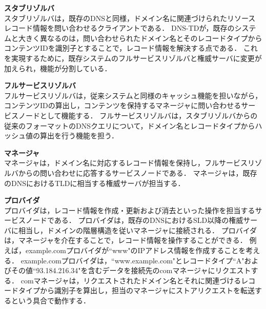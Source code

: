 \hspace{-12pt}\textbf{スタブリゾルバ}\\
\hspace{12pt}スタブリゾルバは，既存のDNSと同様，ドメイン名に関連づけられたリソースレコード情報を問い合わせるクライアントである．
DNS-TDが，既存のシステムと大きく異なるのは，問い合わせられたドメイン名とそのレコードタイプからコンテンツIDを識別子とすることで，レコード情報を解決する点である．
これを実現するために，既存システムのフルサービスリゾルバと権威サーバに変更が加えられ，機能が分割している．\newline

\hspace{-12pt}\textbf{フルサービスリゾルバ}\\
\hspace{12pt}フルサービスリゾルバは，従来システムと同様のキャッシュ機能を担いながら，コンテンツIDの算出し，コンテンツを保持するマネージャに問い合わせるサービスノードとして機能する．
フルサービスリゾルバは，スタブリゾルバからの従来のフォーマットのDNSクエリについて，ドメイン名とレコードタイプからハッシュ値の算出を行う機能を担う．


\newpage
\hspace{-12pt}\textbf{マネージャ}\\
\hspace{12pt} マネージャは，ドメイン名に対応するレコード情報を保持し，フルサービスリゾルバからの問い合わせに応答するサービスノードである．
マネージャは，既存のDNSにおけるTLDに相当する権威サーバが担当する．


\hspace{-12pt}\textbf{プロバイダ}\\
\hspace{12pt}プロバイダは，レコード情報を作成・更新および消去といった操作を担当するサービスノードである．
プロバイダは，既存のDNSにおけるSLD以降の権威サーバに相当し，ドメインの階層構造を従いマネージャに接続される．
プロバイダは，マネージャを介在することで，レコード情報を操作することができる．
例えば，example.comプロバイダが``www"のIPアドレス情報を作成することを考える．
example.comプロバイダは，``www.example.com"とレコードタイプ``A"およびその値``93.184.216.34"を含むデータを接続先のcomマネージャにリクエストする．
comマネージャは，リクエストされたドメイン名とそれに関連づけるレコードタイプから識別子を算出し，担当のマネージャにストアリクエストを転送するという具合で動作する．


